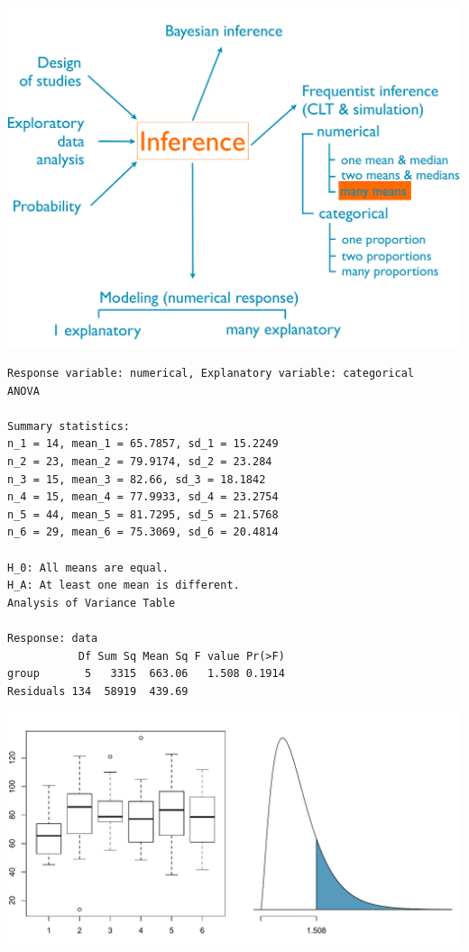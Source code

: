 \documentclass[11pt,containsverbatim,handout,xcolor=xelatex,dvipsnames,table]{beamer}
\begin{document}
\begin{frame}[fragile]

{
{\scriptsize
{}}}
{
 \includegraphics[width=\textwidth]{figures/map/many_mean}
}


{\scriptsize
\begin{verbatim}
Response variable: numerical, Explanatory variable: categorical
ANOVA

Summary statistics:
n_1 = 14, mean_1 = 65.7857, sd_1 = 15.2249
n_2 = 23, mean_2 = 79.9174, sd_2 = 23.284
n_3 = 15, mean_3 = 82.66, sd_3 = 18.1842
n_4 = 15, mean_4 = 77.9933, sd_4 = 23.2754
n_5 = 44, mean_5 = 81.7295, sd_5 = 21.5768
n_6 = 29, mean_6 = 75.3069, sd_6 = 20.4814

H_0: All means are equal.
H_A: At least one mean is different.
Analysis of Variance Table

Response: data
           Df Sum Sq Mean Sq F value Pr(>F)
group       5   3315  663.06   1.508 0.1914
Residuals 134  58919  439.69 
\end{verbatim}
}

\end{frame}


\begin{frame}

\includegraphics[width=\textwidth]{figures/anova/tellers}

\end{frame}
\end{document}
